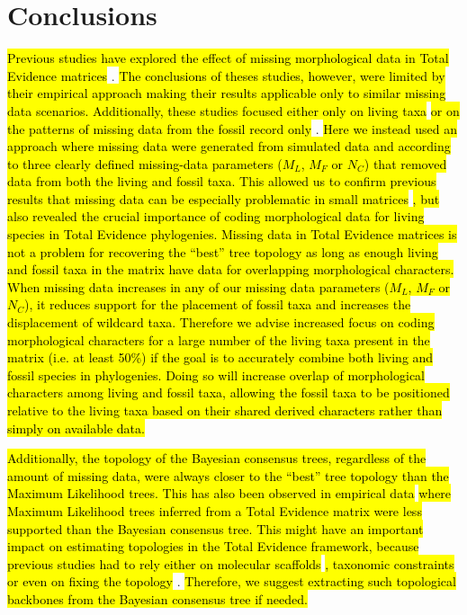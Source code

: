 \documentclass[12pt,letterpaper]{article}
\begin{document}
\section{Conclusions}
\hl{Previous studies have explored the effect of missing morphological data in Total Evidence matrices }\citep{Wiens01102005,manosphylogeny2007,pattinsonphylogeny2014}.
\hl{The conclusions of theses studies, however, were limited by their empirical approach making their results applicable only to similar missing data scenarios.
Additionally, these studies focused either only on living taxa }\citep{Wiens01102005}\hl{ or on the patterns of missing data from the fossil record only }\citep{manosphylogeny2007,pattinsonphylogeny2014}.
\hl{Here we instead used an approach where missing data were generated from simulated data and according to three clearly defined missing-data parameters ($M_{L}$, $M_{F}$ or $N_{C}$) that removed data from both the living and fossil taxa.
This allowed us to confirm previous results that missing data can be especially problematic in small matrices }\citep{wiensmissing2003}\hl{, but also revealed the crucial importance of coding morphological data for living species in Total Evidence phylogenies.
Missing data in Total Evidence matrices is not a problem for recovering the ``best'' tree topology as long as enough living and fossil taxa in the matrix have data for overlapping morphological characters.
When missing data increases in any of our missing data parameters ($M_{L}$, $M_{F}$ or $N_{C}$), it reduces support for the placement of fossil taxa and increases the displacement of wildcard taxa.
Therefore we advise increased focus on coding morphological characters for a large number of the living taxa present in the matrix (i.e. at least 50\%) if the goal is to accurately combine both living and fossil species in phylogenies.
Doing so will increase overlap of morphological characters among living and fossil taxa, allowing the fossil taxa to be positioned relative to the living taxa based on their shared derived characters rather than simply on available data.}

\hl{Additionally, the topology of the Bayesian consensus trees, regardless of the amount of missing data, were always closer to the ``best'' tree topology than the Maximum Likelihood trees.
This has also been observed in empirical data }\citep[\hl{e.g.}][]{Arcila2015131}\hl{ where Maximum Likelihood trees inferred from a Total Evidence matrix were less supported than the Bayesian consensus tree.
This might have an important impact on estimating topologies in the Total Evidence framework, because previous studies had to rely either on molecular scaffolds }\citep[\hl{e.g.}][]{slaterphylogenetic2013}\hl{, taxonomic constraints }\citep[\hl{e.g.}][]{slaterphylogenetic2013,beckancient2014}\hl{ or even on fixing the topology }\citep[\hl{e.g.}][]{ronquista2012}.
\hl{Therefore, we suggest extracting such topological backbones from the Bayesian consensus tree if needed.} 
\end{document}

